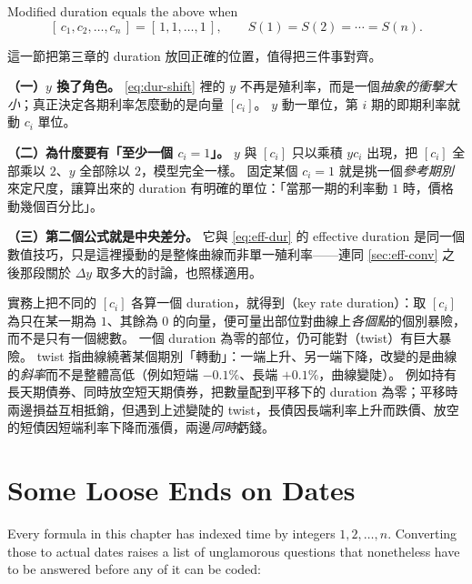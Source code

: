 Modified duration equals the above when
\[
	[\,c_{1},c_{2},\ldots,c_{n}\,] = [\,1,1,\ldots,1\,] ,
	\qquad
	S(1)=S(2)=\cdots=S(n) .
\]

\suppstart
\begin{remark}
	這一節把第三章的 duration 放回正確的位置，值得把三件事對齊。

	\textbf{（一）$y$ 換了角色。}
	\eqref{eq:dur-shift} 裡的 $y$ 不再是殖利率，而是一個\emph{抽象的衝擊大小}；真正決定各期利率怎麼動的是向量 $[c_{i}]$。
	$y$ 動一單位，第 $i$ 期的即期利率就動 $c_{i}$ 單位。

	\textbf{（二）為什麼要有「至少一個 $c_{i}=1$」。}
	$y$ 與 $[c_{i}]$ 只以乘積 $y c_{i}$ 出現，把 $[c_{i}]$ 全部乘以 $2$、$y$ 全部除以 $2$，模型完全一樣。
	固定某個 $c_{i}=1$ 就是挑一個\emph{參考期別}來定尺度，讓算出來的 duration 有明確的單位：「當那一期的利率動 $1$ 時，價格動幾個百分比」。

	\textbf{（三）第二個公式就是中央差分。}
	它與 \eqref{eq:eff-dur} 的 effective duration 是同一個數值技巧，只是這裡擾動的是整條曲線而非單一殖利率——連同 \autoref{sec:eff-conv} 之後那段關於 $\Delta y$ 取多大的討論，也照樣適用。

	實務上把不同的 $[c_{i}]$ 各算一個 duration，就得到（key rate duration）：取 $[c_{i}]$ 為只在某一期為 $1$、其餘為 $0$ 的向量，便可量出部位對曲線上\emph{各個點}的個別暴險，而不是只有一個總數。
	一個 duration 為零的部位，仍可能對（twist）有巨大暴險。
	twist 指曲線繞著某個期別「轉動」：一端上升、另一端下降，改變的是曲線的\emph{斜率}而不是整體高低（例如短端 $-0.1\%$、長端 $+0.1\%$，曲線變陡）。
	例如持有長天期債券、同時放空短天期債券，把數量配到平移下的 duration 為零；平移時兩邊損益互相抵銷，但遇到上述變陡的 twist，長債因長端利率上升而跌價、放空的短債因短端利率下降而漲價，兩邊\emph{同時}虧錢。
\end{remark}
\suppend

\section{Some Loose Ends on Dates}


Every formula in this chapter has indexed time by integers $1,2,\ldots,n$.
Converting those to actual dates raises a list of unglamorous questions that nonetheless have to be answered before any of it can be coded:

